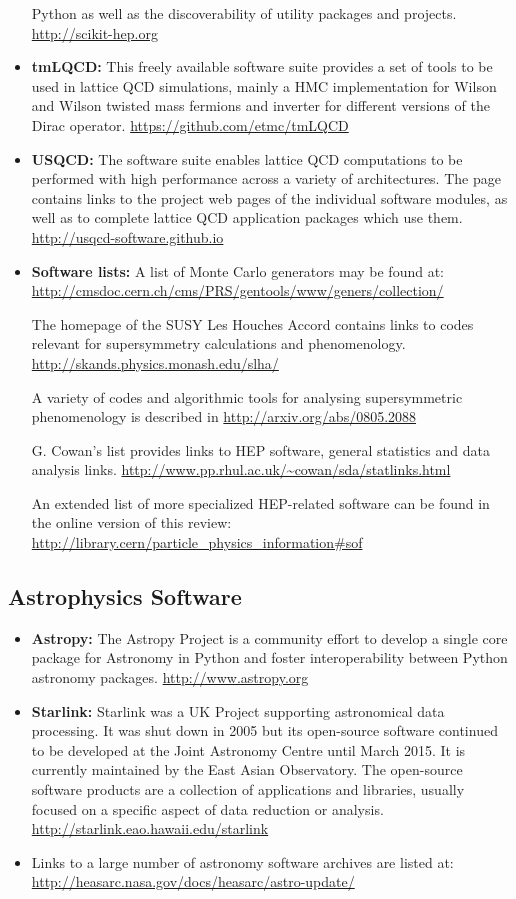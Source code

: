 \begin{itemize}
  Python as well as the discoverability of utility packages and
  projects. \url{http://scikit-hep.org}
\item
  \textbf{tmLQCD:} This freely available software suite provides a set
  of tools to be used in lattice QCD simulations, mainly a HMC
  implementation for Wilson and Wilson twisted mass fermions and
  inverter for different versions of the Dirac operator.
  \url{https://github.com/etmc/tmLQCD}
\item
  \textbf{USQCD:} The software suite enables lattice QCD computations to
  be performed with high performance across a variety of architectures.
  The page contains links to the project web pages of the individual
  software modules, as well as to complete lattice QCD application
  packages which use them. \url{http://usqcd-software.github.io}
\item
  \textbf{Software lists:} A list of Monte Carlo generators may be found
  at:
  \url{http://cmsdoc.cern.ch/cms/PRS/gentools/www/geners/collection/}

  The homepage of the SUSY Les Houches Accord contains links to codes
  relevant for supersymmetry calculations and phenomenology.
  \url{http://skands.physics.monash.edu/slha/}

  A variety of codes and algorithmic tools for analysing supersymmetric
  phenomenology is described in \url{http://arxiv.org/abs/0805.2088}

  G. Cowan's list provides links to HEP software, general statistics and
  data analysis links.
  \url{http://www.pp.rhul.ac.uk/~cowan/sda/statlinks.html}

  An extended list of more specialized HEP-related software can be found
  in the online version of this review:
  \url{http://library.cern/particle_physics_information\#sof}
\end{itemize}

\subsection{Astrophysics Software}\label{databases:subsec:astrophysics}

\begin{itemize}
\item
  \textbf{Astropy:} The Astropy Project is a community effort to develop
  a single core package for Astronomy in Python and foster
  interoperability between Python astronomy packages.
  \url{http://www.astropy.org}
\item
  \textbf{Starlink:} Starlink was a UK Project supporting astronomical
  data processing. It was shut down in 2005 but its open-source software
  continued to be developed at the Joint Astronomy Centre until March
  2015. It is currently maintained by the East Asian Observatory. The
  open-source software products are a collection of applications and
  libraries, usually focused on a specific aspect of data reduction or
  analysis. \url{http://starlink.eao.hawaii.edu/starlink}
\item
  Links to a large number of astronomy software archives are listed at:
  \url{http://heasarc.nasa.gov/docs/heasarc/astro-update/}
\end{itemize}

